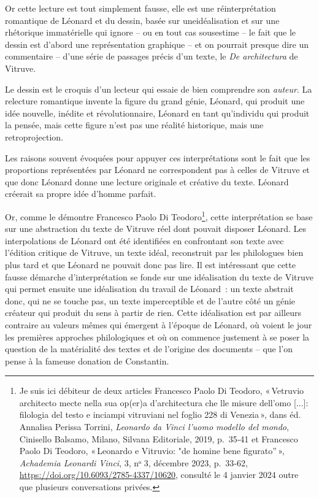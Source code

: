 Or cette lecture est tout simplement fausse, elle est une
réinterprétation romantique de Léonard et du dessin, basée sur
uneidéalisation et sur une rhétorique immatérielle qui ignore -- ou en
tout cas sousestime -- le fait que le dessin est d'abord une
représentation graphique -- et on pourrait presque dire un commentaire
-- d'une série de passages précis d'un texte, le \emph{De architectura}
de Vitruve.

Le dessin est le croquis d'un lecteur qui essaie de bien comprendre son
\emph{auteur}. La relecture romantique invente la figure du grand génie,
Léonard, qui produit une idée nouvelle, inédite et révolutionnaire,
Léonard en tant qu'individu qui produit la pensée, mais cette figure
n'est pas une réalité historique, mais une retroprojection.

Les raisons souvent évoquées pour appuyer ces interprétations sont le
fait que les proportions représentées par Léonard ne correspondent pas à
celles de Vitruve et que donc Léonard donne une lecture originale et
créative du texte. Léonard créerait sa propre idée d'homme parfait.

Or, comme le démontre Francesco Paolo Di Teodoro\footnote{Je suis ici
  débiteur de deux articles Francesco Paolo Di Teodoro, {«\,Vetruvio
  architecto mecte nella sua op(er)a d'architectura che lle misure
  dell'omo {[}...{]}: filologia del testo e inciampi vitruviani nel
  foglio 228 di {Venezia}\,»}, dans éd. Annalisa Perissa Torrini,
  \emph{Leonardo da {Vinci} l'uomo modello del mondo}, Cinisello
  Balsamo, Milano, Silvana Editoriale, 2019, p.~35‑41 et Francesco Paolo
  Di Teodoro, {«\,Leonardo e {Vitruvio}: "de homine bene figurato''\,»},
  \emph{Achademia Leonardi Vinci}, 3, nᵒ 3, décembre 2023, p.~33‑62,
  \url{https://doi.org/10.6093/2785-4337/10620}, consulté le 4 janvier
  2024 outre que plusieurs conversations privées.}, cette interprétation
se base sur une abstraction du texte de Vitruve réel dont pouvait
disposer Léonard. Les interpolations de Léonard ont été identifiées en
confrontant son texte avec l'édition critique de Vitruve, un texte
idéal, reconstruit par les philologues bien plus tard et que Léonard ne
pouvait donc pas lire. Il est intéressant que cette fausse démarche
d'interprétation se fonde sur une idéalisation du texte de Vitruve qui
permet ensuite une idéalisation du travail de Léonard~: un texte
abstrait donc, qui ne se touche pas, un texte imperceptible et de
l'autre côté un génie créateur qui produit du sens à partir de rien.
Cette idéalisation est par ailleurs contraire au valeurs mêmes qui
émergent à l'époque de Léonard, où voient le jour les premières
approches philologiques et où on commence justement à se poser la
question de la matérialité des textes et de l'origine des documents --
que l'on pense à la fameuse donation de Constantin.

